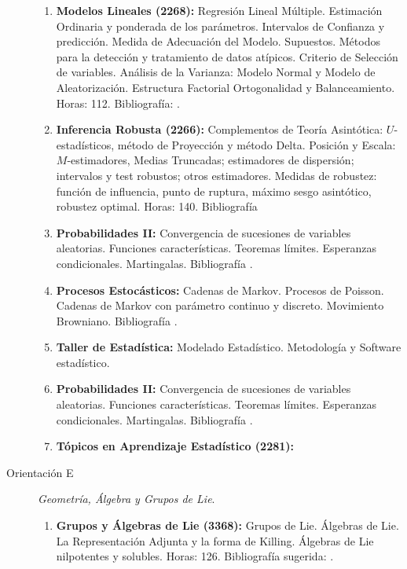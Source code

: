 \documentclass[a4paper, 12pt]{article}
\begin{document}
\begin{description}
\begin{enumerate}
\item\textbf{ Modelos Lineales (2268):} Regresión Lineal Múltiple. Estimación
Ordinaria y ponderada de los parámetros. Intervalos de Confianza y
predicción. Medida de Adecuación del Modelo. Supuestos. Métodos
para la detección y tratamiento de datos atípicos. Criterio de
Selección de va\-riables. Análisis de la Varianza: Modelo Normal y
Modelo de Aleato\-rización. Estructura Factorial Ortogonalidad y
Balanceamiento. Horas: 112. Bibliografía: \cite{peck,rawlyngs,  searle}.

\item\textbf{ Inferencia Robusta (2266):}
Complementos de Teoría Asintótica: $U$-estadísticos, método de Proyección y método Delta. Posición y Escala: $M$-estimadores, Medias Truncadas; estimadores de dispersión; intervalos y test robustos; otros estimadores.   Medidas de robustez: función de influencia, punto de ruptura, máximo sesgo asintótico, robustez optimal.  Horas: 140.
Bibliografía \cite{maronna2006robust}


\item\textbf{Probabilidades II:}  Convergencia de sucesiones de
variables aleatorias. Funciones características. Teoremas límites.
Esperanzas condicionales. Martingalas. Bibliografía \cite{ barry,
breiman,karr}.

\item\textbf{Procesos Estocásticos:} Cadenas de Markov. Procesos de Poisson.
Cadenas de Markov con parámetro continuo y discreto. Movimiento
Browniano. Bibliografía \cite{allen,cox, parzen2,karlin}.

\item\textbf{Taller de Estadística:} Modelado Estadístico. Metodología y Software
estadístico.

\item\textbf{Probabilidades II:}  Convergencia de sucesiones de
variables aleatorias. Funciones características. Teoremas límites.
Esperanzas condicionales. Martingalas. Bibliografía \cite{ barry,
breiman,karr}.

\item\textbf{Tópicos en Aprendizaje Estadístico (2281):} 


\end{enumerate}


\item[Orientación E]\emph{Geometría, Álgebra y Grupos de Lie}.

 \begin{enumerate}
\item\textbf{ Grupos y Álgebras de Lie (3368):}  Grupos de Lie. Álgebras de Lie. La Representación Adjunta y la forma de Killing. Álgebras de Lie nilpotentes y solubles.
Horas: 126. Bibliografía sugerida: \cite{boothby2003introduction, helgason2001differential}.


\end{enumerate}
\end{description}
\end{document}
